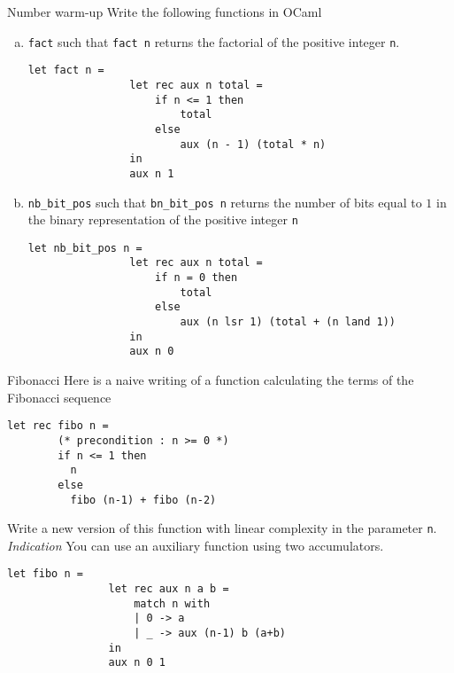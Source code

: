 \begin{problem}{Number warm-up}{}
    Write the following functions in OCaml
    
    \begin{enumerate}[(a)]
        \item \lstinline|fact| such that \lstinline|fact n| returns the factorial of the positive integer \lstinline|n|.

        \begin{lstlisting}[style=caml]
            let fact n =
                let rec aux n total = 
                    if n <= 1 then 
                        total
                    else
                        aux (n - 1) (total * n)
                in
                aux n 1
        \end{lstlisting}
        
        \item \lstinline|nb_bit_pos| such that \lstinline|bn_bit_pos n| returns the number of bits equal to $1$ in the binary representation of the positive integer \lstinline|n|
        \begin{lstlisting}[style=caml]
            let nb_bit_pos n =
                let rec aux n total =
                    if n = 0 then
                        total
                    else
                        aux (n lsr 1) (total + (n land 1))
                in
                aux n 0
        \end{lstlisting}
    \end{enumerate}

\end{problem}

\begin{problem}{Fibonacci}{}
    Here is a naive writing of a function calculating the terms of the Fibonacci sequence
    
    \begin{lstlisting}[style=caml]
      let rec fibo n =
        (* precondition : n >= 0 *)
        if n <= 1 then 
          n
        else 
          fibo (n-1) + fibo (n-2)
    \end{lstlisting}
    Write a new version of this function with linear complexity in the parameter \lstinline|n|.
    \textit{Indication} You can use an auxiliary function using two accumulators.

    \begin{lstlisting}[style=caml]
            let fibo n =
                let rec aux n a b =
                    match n with
                    | 0 -> a
                    | _ -> aux (n-1) b (a+b)
                in
                aux n 0 1
    \end{lstlisting}
    
\end{problem}

